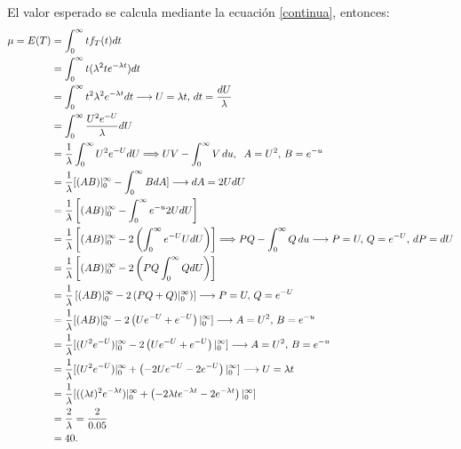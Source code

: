 \documentclass{article}
\begin{document}
\noindent El valor esperado se calcula mediante la ecuación \ref{continua}, entonces: 
\begin{align}
\nonumber
\mu = E{(T)}    & = \int_{0}^{\infty}tf_{T}(t)dt \\ \nonumber
                & = \int_{0}^{\infty}t(\lambda^2 te^{- \lambda t})dt \\ \nonumber
                & = \int_{0}^{\infty} t^2 \lambda^2 e^{- \lambda t}dt \longrightarrow U = \lambda t,  \,  dt = \frac{dU}{\lambda} \\ \nonumber
            & = \int_{0}^{\infty} \frac{U^2 e^{-U}}{\lambda} dU \\ \nonumber
            & = \frac{1}{\lambda} \int_{0}^{\infty} U^2 e^{-U}dU \Longrightarrow UV - \int_{0}^{\infty} V \, du, \hspace{2mm} A=U^2,  \,  B=e^{-u}\\ \nonumber
            & = \frac{1}{\lambda} [(AB)|^{\infty}_{0} - \int_{0}^{\infty} BdA] \longrightarrow dA=2UdU \\ \nonumber
            & = \frac{1}{\lambda} \left[(AB)|^{\infty}_{0}  - \int_{0}^{\infty} e^{-u}2UdU \right] \\ \nonumber
            & = \frac{1}{\lambda} \left[(AB)|^{\infty}_{0}  - 2 \left(\int_{0}^{\infty} e^{-U}UdU \right)\right] \Longrightarrow PQ - \int_{0}^{\infty} Q \, du \longrightarrow P=U,  \,  Q=e^{-U}, \, dP = dU \\ \nonumber \nonumber
            & = \frac{1}{\lambda} \left[(AB)|^{\infty}_{0}  - 2 \left(PQ \int_{0}^{\infty} QdU \right) \right] \\ \nonumber 
            & = \frac{1}{\lambda} \left[ (AB)|^{\infty}_{0} - 2 \left(PQ + Q)|^{\infty}_{0} \right) \right] \longrightarrow P=U,  \,  Q=e^{-U} \\ \nonumber
            & = \frac{1}{\lambda} [(AB)|^{\infty}_{0}  - 2 \left(Ue^{-U} + e^{-U} \right)|^{\infty}_{0}] \longrightarrow A=U^2,  \,  B=e^{-u} \\ \nonumber
            & = \frac{1}{\lambda} [(U^2 e^{-U})|^{\infty}_{0} - 2 \left(Ue^{-U} + e^{-U} \right)|^{\infty}_{0}] \longrightarrow A=U^2,  \,  B=e^{-u} \\ \nonumber
            & = \frac{1}{\lambda} [(U^2 e^{-U})|^{\infty}_{0} + \left(-2 Ue^{-U} - 2e^{-U} \right)|^{\infty}_{0}] \longrightarrow U = \lambda t \\ \nonumber
            & = \frac{1}{\lambda} [((\lambda t)^2 e^{-\lambda t})|^{\infty}_{0} + \left(-2\lambda t e^{-\lambda t} - 2e^{-\lambda t} \right)|^{\infty}_{0}] \\ \nonumber
            & = \frac{2}{\lambda} = \frac{2}{0.05} \\ \nonumber
            & = 40. \\ \nonumber
\end{align}
\end{document}
